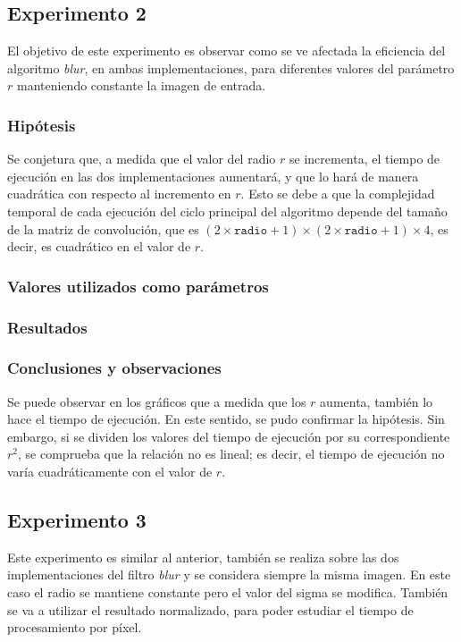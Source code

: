	\subsection{Experimento 2}
		El objetivo de este experimento es observar como se ve afectada la eficiencia del algoritmo \emph{blur}, en ambas implementaciones, para diferentes valores del parámetro $r$ manteniendo constante la imagen de entrada.

		\subsubsection{Hipótesis} 
			Se conjetura que, a medida que el valor del radio $r$ se incrementa, el tiempo de ejecución en las dos implementaciones aumentará, y que lo hará de manera cuadrática con respecto al incremento en $r$. Esto se debe a que la complejidad temporal de cada ejecución del ciclo principal del algoritmo depende del tamaño de la matriz de convolución, que es $(2 \times \mathtt{radio} + 1) \times (2 \times \mathtt{radio} + 1) \times 4$, es decir, es cuadrático en el valor de $r$.

		\subsubsection{Valores utilizados como parámetros} 

		\subsubsection{Resultados}

		\subsubsection{Conclusiones y observaciones}
			Se puede observar en los gráficos que a medida que los $r$ aumenta, también lo hace el tiempo de ejecución. En este sentido, se pudo confirmar la hipótesis. Sin embargo, si se dividen los valores del tiempo de ejecución por su correspondiente $r^2$, se comprueba que la relación no es lineal; es decir, el tiempo de ejecución no varía cuadráticamente con el valor de $r$.

	\subsection{Experimento 3}
		Este experimento es similar al anterior, también se realiza sobre las dos implementaciones del filtro \emph{blur} y se considera siempre la misma imagen. En este caso el radio se mantiene constante pero el valor del sigma se modifica. También se va a utilizar el resultado normalizado, para poder estudiar el tiempo de procesamiento por píxel. 

